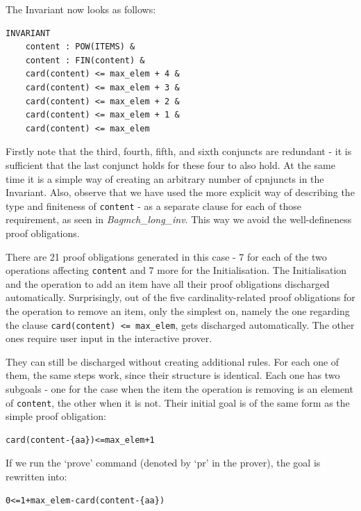 \documentclass[12pt,journal,duplex]{IEEEtran}
\begin{document}
	The Invariant now looks as follows:
	\begin{lstlisting}
INVARIANT
	content : POW(ITEMS) &
	content : FIN(content) &
	card(content) <= max_elem + 4 &
	card(content) <= max_elem + 3 &
	card(content) <= max_elem + 2 &
	card(content) <= max_elem + 1 &
	card(content) <= max_elem
	\end{lstlisting}
	Firstly note that the third, fourth, fifth, and sixth conjuncts are redundant - it is sufficient that the last conjunct holds for these four to also hold. At the same time it is a simple way of creating an arbitrary number of cpnjuncts in the Invariant. Also, observe that we have used the more explicit way of describing the type and finiteness of \texttt{content} - as a separate clause for each of those requirement, as seen in \emph{Bagmch\_long\_inv}. This way we avoid the well-defineness proof obligations.

	There are 21 proof obligations generated in this case - 7 for each of the two operations affecting \texttt{content} and 7 more for the Initialisation. The Initialisation and the operation to add an item have all their proof obligations discharged automatically. Surprisingly, out of the five cardinality-related proof obligations for the operation to remove an item, only the simplest on, namely the one regarding the clause \texttt{card(content) <= max\_elem}, gets discharged automatically. The other ones require user input in the interactive prover.

	They can still be discharged without creating additional rules. For each one of them, the same steps work, since their structure is identical. Each one has two subgoals - one for the case when the item the operation is removing is an element of \texttt{content}, the other when it is not. Their initial goal is of the same form as the simple proof obligation:
	\begin{lstlisting}
card(content-{aa})<=max_elem+1
	\end{lstlisting}
	If we run the `prove' command (denoted by `pr' in the prover), the goal is rewritten into:
	\begin{lstlisting}
0<=1+max_elem-card(content-{aa})
	\end{lstlisting}
\end{document}
